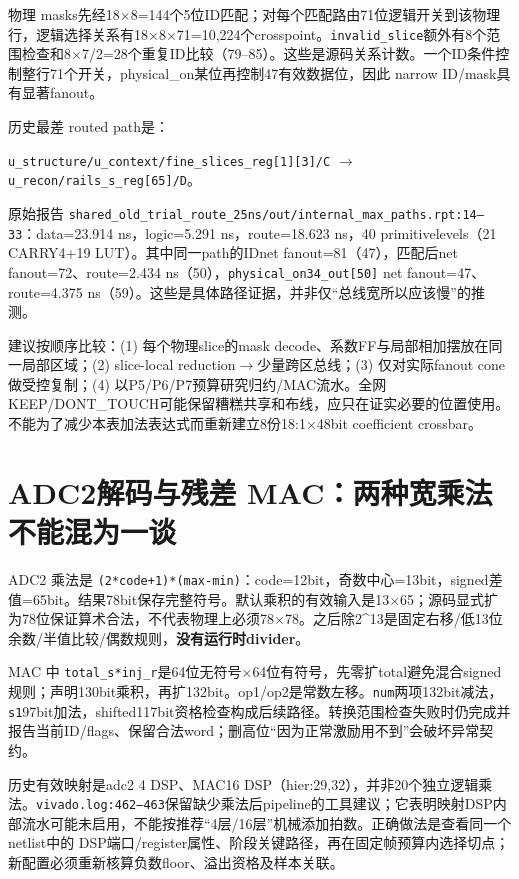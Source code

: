 \documentclass[UTF8,fontset=fandol,10pt,a4paper,openany]{ctexrep}
\newcommand{\code}[1]{\nolinkurl{#1}}
\begin{document}
物理 masks先经18\ensuremath{\times}8=144个5位ID匹配；对每个匹配路由71位逻辑开关到该物理行，逻辑选择关系有18\ensuremath{\times}8\ensuremath{\times}71=10,224个crosspoint。\code{invalid_slice}额外有8个范围检查和8\ensuremath{\times}7/2=28个重复ID比较（79–85）。这些是源码关系计数。一个ID条件控制整行71个开关，physical\_on某位再控制47有效数据位，因此 narrow ID/mask具有显著fanout。


历史最差 routed path是：


\code{u_structure/u_context/fine_slices_reg[1][3]/C} \ensuremath{\rightarrow} \code{u_recon/rails_s_reg[65]/D}。


原始报告 \code{shared_old_trial_route_25ns/out/internal_max_paths.rpt:14–33}：data=23.914 ns，logic=5.291 ns，route=18.623 ns，40 primitivelevels（21 CARRY4+19 LUT）。其中同一path的IDnet fanout=81（47），匹配后net fanout=72、route=2.434 ns（50），\code{physical_on34_out[50]} net fanout=47、route=4.375 ns（59）。这些是具体路径证据，并非仅“总线宽所以应该慢”的推测。


建议按顺序比较：(1) 每个物理slice的mask decode、系数FF与局部相加摆放在同一局部区域；(2) slice-local reduction\ensuremath{\rightarrow}少量跨区总线；(3) 仅对实际fanout cone做受控复制；(4) 以P5/P6/P7预算研究归约/MAC流水。全网KEEP/DONT\_TOUCH可能保留糟糕共享和布线，应只在证实必要的位置使用。不能为了减少本表加法表达式而重新建立8份18:1\ensuremath{\times}48bit coefficient crossbar。


\section{ADC2解码与残差 MAC：两种宽乘法不能混为一谈}


ADC2 乘法是 \code{(2*code+1)*(max-min)}：code=12bit，奇数中心=13bit，signed差值=65bit。结果78bit保存完整符号。默认乘积的有效输入是13\ensuremath{\times}65；源码显式扩为78位保证算术合法，不代表物理上必须78\ensuremath{\times}78。之后除2\textasciicircum{}13是固定右移/低13位余数/半值比较/偶数规则，\textbf{没有运行时divider}。


MAC 中 \code{total_s*inj_r}是64位无符号\ensuremath{\times}64位有符号，先零扩total避免混合signed规则；声明130bit乘积，再扩132bit。op1/op2是常数左移。\code{num}两项132bit减法，\code{s1}97bit加法，shifted117bit资格检查构成后续路径。转换范围检查失败时仍完成并报告当前ID/flags、保留合法word；删高位“因为正常激励用不到”会破坏异常契约。


历史有效映射是adc2 4 DSP、MAC16 DSP（hier:29,32），并非20个独立逻辑乘法。\code{vivado.log:462–463}保留缺少乘法后pipeline的工具建议；它表明映射DSP内部流水可能未启用，不能按推荐“4层/16层”机械添加拍数。正确做法是查看同一个netlist中的 DSP端口/register属性、阶段关键路径，再在固定帧预算内选择切点；新配置必须重新核算负数floor、溢出资格及样本关联。
\end{document}
